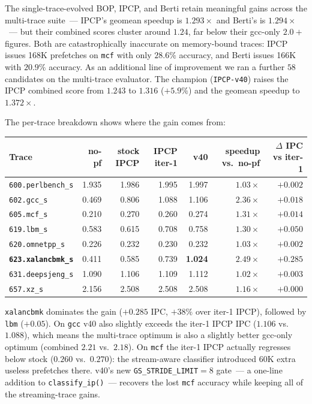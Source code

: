 \documentclass[11pt]{article}
\begin{document}
The single-trace-evolved BOP, IPCP, and Berti retain meaningful gains
across the multi-trace suite~--- IPCP's geomean speedup is $1.293\times$
and Berti's is $1.294\times$~--- but their combined scores cluster
around $1.24$, far below their gcc-only $2.0+$ figures. Both are
catastrophically inaccurate on memory-bound traces: IPCP issues 168K
prefetches on \texttt{mcf} with only $28.6\%$ accuracy, and Berti issues
166K with $20.9\%$ accuracy. As an additional line of improvement we ran
a further $58$ candidates on the multi-trace evaluator. The champion
(\texttt{IPCP-v40}) raises the IPCP combined score from $1.243$ to
$1.316$ ($+5.9\%$) and the geomean speedup to $1.372\times$.

The per-trace breakdown shows where the gain comes from:

\begin{center}\small
\begin{tabular}{l r r r r r r}
\toprule
Trace & no-pf & stock IPCP & IPCP iter-1 & \textbf{v40} & speedup vs.\ no-pf & $\Delta$ IPC vs iter-1 \\
\midrule
\texttt{600.perlbench\_s} & 1.935 & 1.986 & 1.995 & 1.997 & $1.03\times$ & $+0.002$ \\
\texttt{602.gcc\_s}       & 0.469 & 0.806 & 1.088 & 1.106 & $2.36\times$ & $+0.018$ \\
\texttt{605.mcf\_s}       & 0.210 & 0.270 & 0.260 & 0.274 & $1.31\times$ & $+0.014$ \\
\texttt{619.lbm\_s}       & 0.583 & 0.615 & 0.708 & 0.758 & $1.30\times$ & $+0.050$ \\
\texttt{620.omnetpp\_s}   & 0.226 & 0.232 & 0.230 & 0.232 & $1.03\times$ & $+0.002$ \\
\textbf{\texttt{623.xalancbmk\_s}} & 0.411 & 0.585 & 0.739 & \textbf{1.024} & $\mathbf{2.49\times}$ & $\mathbf{+0.285}$ \\
\texttt{631.deepsjeng\_s} & 1.090 & 1.106 & 1.109 & 1.112 & $1.02\times$ & $+0.003$ \\
\texttt{657.xz\_s}        & 2.156 & 2.508 & 2.508 & 2.508 & $1.16\times$ & $+0.000$ \\
\bottomrule
\end{tabular}
\end{center}

\texttt{xalancbmk} dominates the gain ($+0.285$ IPC, $+38\%$ over
iter-1 IPCP), followed by \texttt{lbm} ($+0.05$). On \texttt{gcc} v40
also slightly exceeds the iter-1 IPCP IPC ($1.106$ vs.~$1.088$), which
means the multi-trace optimum is also a slightly better gcc-only
optimum (combined $2.21$ vs.~$2.18$). On \texttt{mcf} the iter-1 IPCP
actually regresses below stock ($0.260$ vs.~$0.270$): the stream-aware
classifier introduced 60K extra useless prefetches there. v40's new
\texttt{GS\_STRIDE\_LIMIT}$=8$ gate~--- a one-line addition to
\texttt{classify\_ip()}~--- recovers the lost \texttt{mcf} accuracy
while keeping all of the streaming-trace gains.
\end{document}
